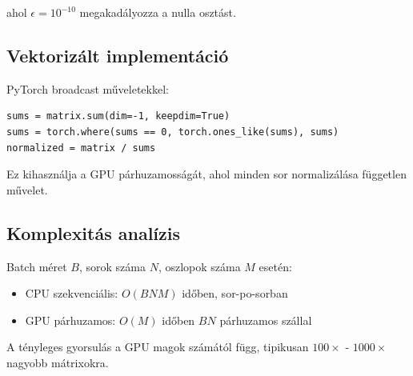 ahol $\epsilon = 10^{-10}$ megakadályozza a nulla osztást.

\subsection{Vektorizált implementáció}

PyTorch broadcast műveletekkel:

\begin{lstlisting}
sums = matrix.sum(dim=-1, keepdim=True)
sums = torch.where(sums == 0, torch.ones_like(sums), sums)
normalized = matrix / sums
\end{lstlisting}

Ez kihasználja a GPU párhuzamosságát, ahol minden sor normalizálása független művelet.

\subsection{Komplexitás analízis}

Batch méret $B$, sorok száma $N$, oszlopok száma $M$ esetén:
\begin{itemize}
    \item CPU szekvenciális: $O(BNM)$ időben, sor-po-sorban
    \item GPU párhuzamos: $O(M)$ időben $BN$ párhuzamos szállal
\end{itemize}

A tényleges gyorsulás a GPU magok számától függ, tipikusan $100\times$ - $1000\times$ nagyobb mátrixokra.
